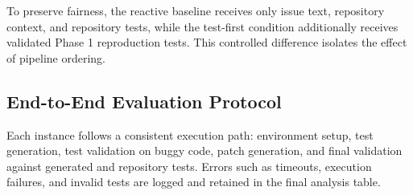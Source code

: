 \documentclass[12pt]{article}
\begin{document}
To preserve fairness, the reactive baseline receives only issue text, repository context, and repository tests, while the test-first condition additionally receives validated Phase 1 reproduction tests. This controlled difference isolates the effect of pipeline ordering.
\subsection{End-to-End Evaluation Protocol}

Each instance follows a consistent execution path: environment setup, test generation, test validation on buggy code, patch generation, and final validation against generated and repository tests. Errors such as timeouts, execution failures, and invalid tests are logged and retained in the final analysis table.






\end{document}

